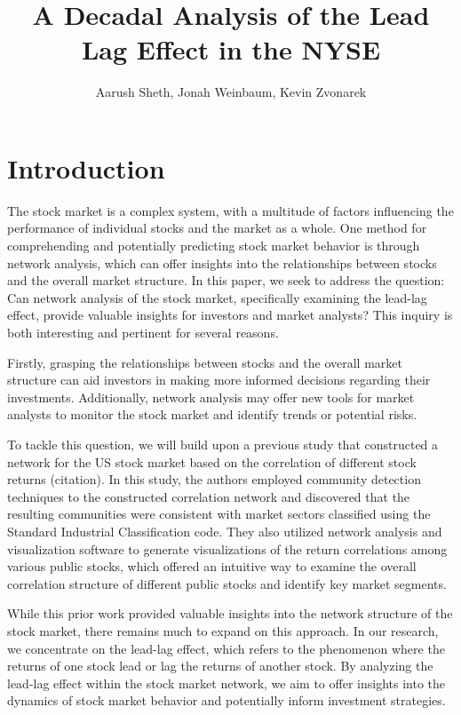\documentclass{article}
\title{A Decadal Analysis of the Lead Lag Effect in the NYSE}
\author{%
  Aarush Sheth, Jonah Weinbaum, Kevin Zvonarek} \\
\begin{document}
\maketitle





\section{Introduction}

The stock market is a complex system, with a multitude of factors influencing the performance of individual stocks and the market as a whole. One method for comprehending and potentially predicting stock market behavior is through network analysis, which can offer insights into the relationships between stocks and the overall market structure. In this paper, we seek to address the question: Can network analysis of the stock market, specifically examining the lead-lag effect, provide valuable insights for investors and market analysts? This inquiry is both interesting and pertinent for several reasons.

Firstly, grasping the relationships between stocks and the overall market structure can aid investors in making more informed decisions regarding their investments. Additionally, network analysis may offer new tools for market analysts to monitor the stock market and identify trends or potential risks.

To tackle this question, we will build upon a previous study that constructed a network for the US stock market based on the correlation of different stock returns (citation). In this study, the authors employed community detection techniques to the constructed correlation network and discovered that the resulting communities were consistent with market sectors classified using the Standard Industrial Classification  code. They also utilized network analysis and visualization software to generate visualizations of the return correlations among various public stocks, which offered an intuitive way to examine the overall correlation structure of different public stocks and identify key market segments.

While this prior work provided valuable insights into the network structure of the stock market, there remains much to expand on this approach. In our research, we  concentrate on the lead-lag effect, which refers to the phenomenon where the returns of one stock lead or lag the returns of another stock. By analyzing the lead-lag effect within the stock market network, we aim to offer insights into the dynamics of stock market behavior and potentially inform investment strategies.
\end{document}
